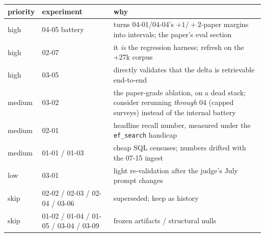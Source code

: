 \documentclass[10pt]{article}
\begin{document}
\begin{center}
\begin{tabular}{llp{8.6cm}}
\toprule
priority & experiment & why \\
\midrule
high & 04-05 battery & turns 04-01/04-04's $+1/+2$-paper margins into intervals; the paper's eval section \\
high & 02-07 & it \emph{is} the regression harness; refresh on the +27k corpus \\
high & 03-05 & directly validates that the delta is retrievable end-to-end \\
medium & 03-02 & the paper-grade ablation, on a dead stack; consider rerunning \emph{through} 04 (capped surveys) instead of the internal battery \\
medium & 02-01 & headline recall number, measured under the \texttt{ef\_search} handicap \\
medium & 01-01 / 01-03 & cheap SQL censuses; numbers drifted with the 07-15 ingest \\
low & 03-01 & light re-validation after the judge's July prompt changes \\
skip & 02-02 / 02-03 / 02-04 / 03-06 & superseded; keep as history \\
skip & 01-02 / 01-04 / 01-05 / 03-04 / 03-09 & frozen artifacts / structural nulls \\
\bottomrule
\end{tabular}
\end{center}
\end{document}
